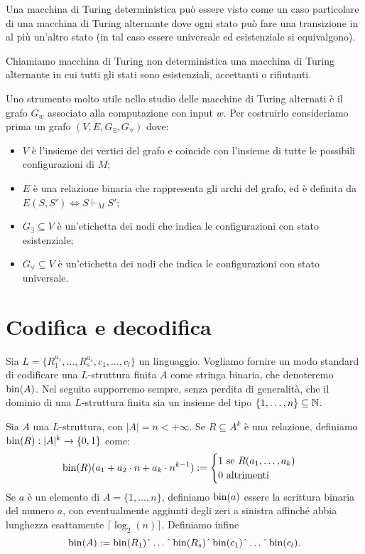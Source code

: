 \begin{osservazione}
 Una macchina di Turing deterministica può essere visto come un caso particolare
 di una macchina di Turing alternante dove ogni stato può fare una transizione
 in al più un'altro stato (in tal caso essere universale
 ed esistenziale si equivalgono).
\end{osservazione}

\begin{definizione}
 Chiamiamo macchina di Turing non deterministica una macchina di Turing alternante
 in cui tutti gli stati sono esistenziali, accettanti o rifiutanti.
\end{definizione}

Uno strumento molto utile nello studio delle macchine di Turing alternati è
il grafo $G_w$ associato alla computazione con input $w$. Per costruirlo consideriamo
prima un grafo $(V,E, G_\exists, G_\forall)$ dove:
\begin{itemize}
 \item $V$ è l'insieme dei vertici del grafo e coincide con l'insieme di tutte le
 possibili configurazioni di $M$;
 \item $E$ è una relazione binaria che rappresenta gli archi del grafo, ed è definita
 da $E(S,S') \iff S \vdash_M S'$;
 \item $G_\exists \subseteq V$ è un'etichetta dei nodi che indica le configurazioni
 con stato esistenziale;
 \item $G_\forall \subseteq V$ è un'etichetta dei nodi che indica le configurazioni
 con stato universale.
\end{itemize}


\section{Codifica e decodifica}
Sia $L=\{R^{a_1}_1, \ldots, R^{a_s}_s, c_1, \ldots, c_l\}$ un linguaggio.
Vogliamo fornire un modo standard di codificare una $L$-struttura finita $A$ come
stringa binaria, che denoteremo $\operatorname{bin}(A)$. Nel seguito supporremo sempre, senza
perdita di generalità, che
il dominio di una $L$-struttura finita sia un insieme del tipo
$\{1,\ldots,n\} \subseteq \mathbb{N}$.

\begin{definizione}
  Sia $A$ una $L$-struttura, con $|A| = n < +\infty$.
  Se $R \subseteq A^k$ è una relazione,
  definiamo $\operatorname{bin}(R): |A|^k \to \{0,1\}$ come:
  \[\operatorname{bin}(R)(a_1 + a_2 \cdot n + a_k \cdot n^{k-1}):=
    \begin{cases}
      1 \mbox{ se } R(a_1,\ldots,a_k) \\
      0 \mbox{ altrimenti}
    \end{cases}
  \]
  Se $a$ è un elemento di $A=\{1,\ldots,n\}$, definiamo $\operatorname{bin}(a)$ essere la
  scrittura binaria del numero $a$, con eventualmente aggiunti degli zeri a
  sinistra affinché abbia lunghezza esattamente $\lceil \log_2(n) \rceil$.
  Definiamo infine
  \[\bin(A):=\bin(R_1)\string^\ldots\string^\bin(R_s)\string^\bin(c_1)\string^\ldots\string^\bin(c_l).\]
\end{definizione}

